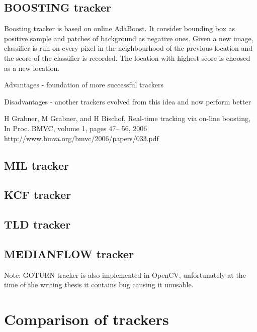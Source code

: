 \subsection{BOOSTING tracker}
Boosting tracker is based on online AdaBoost. It consider bounding box as positive sample and patches of background as negative ones. Given a new image, classifier is run on every pixel in the neighbourhood of the previous location and the score of the classifier is recorded. The location with highest score is choosed as a new location. 

Advantages
- foundation of more successful trackers 

Disadvantages
- another trackers evolved from this idea and now perform better

H Grabner, M Grabner, and H Bischof, Real-time tracking via on-line boosting, In Proc. BMVC, volume 1, pages 47– 56, 2006
http://www.bmva.org/bmvc/2006/papers/033.pdf


\subsection{MIL tracker}



\subsection{KCF tracker}



\subsection{TLD tracker}



\subsection{MEDIANFLOW tracker}





Note: GOTURN tracker is also implemented in OpenCV, unfortunately at the time
of the writing thesis it contains bug causing it unusable.


\section{Comparison of trackers}

